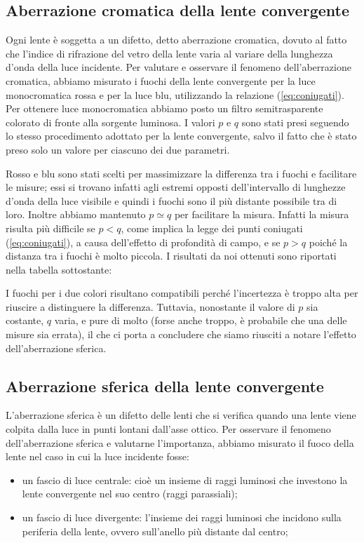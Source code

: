 \subsection{Aberrazione cromatica della lente convergente}

Ogni lente è soggetta a un difetto, detto aberrazione cromatica, dovuto al fatto che l'indice di rifrazione del vetro della lente varia al variare della lunghezza d'onda della luce incidente.
Per valutare e osservare il fenomeno dell'aberrazione cromatica, abbiamo misurato i fuochi della lente convergente per la luce monocromatica rossa e per la luce blu, utilizzando la relazione (\ref{eq:coniugati}).
Per ottenere luce monocromatica abbiamo posto un filtro semitrasparente colorato di fronte alla sorgente luminosa. I valori $p$ e $q$ sono stati presi seguendo lo stesso procedimento adottato per la lente convergente, salvo il fatto che è stato preso solo un valore per ciascuno dei due parametri.

Rosso e blu sono stati scelti per massimizzare la differenza tra i fuochi e facilitare le misure; essi si trovano infatti agli estremi opposti dell'intervallo di lunghezze d'onda della luce visibile e quindi i fuochi sono il più distante possibile tra di loro. Inoltre abbiamo mantenuto $p \simeq q$ per facilitare la misura. Infatti la misura risulta più difficile se $p < q$, come implica la legge dei punti coniugati (\ref{eq:coniugati}), a causa dell'effetto di profondità di campo, e se $p > q$ poiché la distanza tra i fuochi è molto piccola.
I risultati da noi ottenuti sono riportati nella tabella sottostante:


I fuochi per i due colori risultano compatibili perché l'incertezza è troppo alta per riuscire a distinguere la differenza. Tuttavia, nonostante il valore di $p$ sia costante, $q$ varia, e pure di molto (forse anche troppo, è probabile che una delle misure sia errata), il che ci porta a concludere che siamo riusciti a notare l'effetto dell'aberrazione sferica.

\subsection{Aberrazione sferica della lente convergente}

L'aberrazione sferica è un difetto delle lenti che si verifica quando una lente viene colpita dalla luce in punti lontani dall'asse ottico.
Per osservare il fenomeno dell'aberrazione sferica e valutarne l'importanza, abbiamo misurato il fuoco della lente nel caso in cui la luce incidente fosse:
\begin{itemize}
    \item{un fascio di luce centrale: cioè un insieme di raggi luminosi che investono la lente convergente nel suo centro (raggi parassiali);}
	\item{un fascio di luce divergente: l'insieme dei raggi luminosi che incidono sulla periferia della lente, ovvero sull'anello più distante dal centro;}
\end{itemize}

